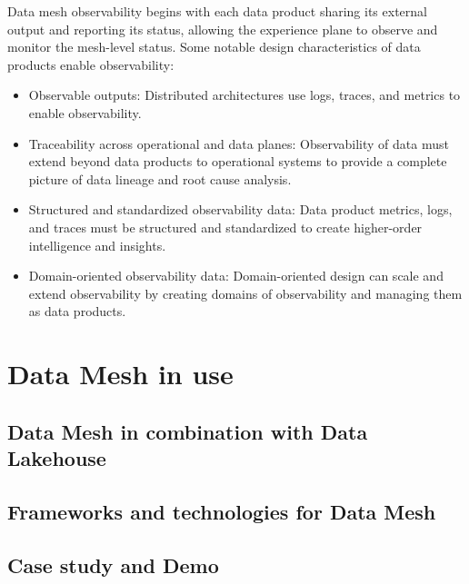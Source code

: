 \documentclass[12pt, a4paper]{book}
\begin{document}
Data mesh observability begins with each data product sharing its external output and reporting its status, allowing the experience plane to observe and monitor the mesh-level status. Some notable design characteristics of data products enable observability:
	\begin{itemize}
		\item Observable outputs: Distributed architectures use logs, traces, and metrics to enable observability.
		\item Traceability across operational and data planes: Observability of data must extend beyond data products to operational systems to provide a complete picture of data lineage and root cause analysis.
		\item Structured and standardized observability data: Data product metrics, logs, and traces must be structured and standardized to create higher-order intelligence and insights.
		\item Domain-oriented observability data: Domain-oriented design can scale and extend observability by creating domains of observability and managing them as data products.
	\end{itemize}

\let\cleardoublepage\clearpage
\chapter{Data Mesh in use}
\section{Data Mesh in combination with Data Lakehouse}

\section{Frameworks and technologies for Data Mesh}

\section{Case study and Demo}


\begingroup
\backmatter
{}
\renewcommand\bibname{References}
\endgroup

\clearpage
\end{document}

